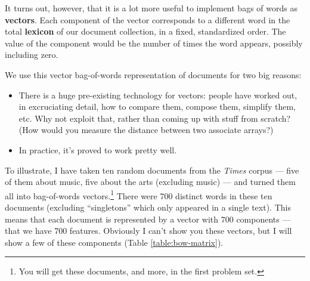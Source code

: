 \documentclass{article}
\begin{document}
It turns out, however, that it is a lot more useful to implement bags of words
as {\bf vectors}.  Each component of the vector corresponds to a different word
in the total {\bf lexicon} of our document collection, in a fixed, standardized
order.  The value of the component would be the number of times the word
appears, possibly including zero.

We use this vector bag-of-words representation of documents for two big
reasons:
\begin{itemize}
\item There is a huge pre-existing technology for vectors: people have worked
  out, in excruciating detail, how to compare them, compose them, simplify
  them, etc.  Why not exploit that, rather than coming up with stuff from
  scratch?  (How would you measure the distance between two associate arrays?)
\item In practice, it's proved to work pretty well.
\end{itemize}




To illustrate, I have taken ten random documents from the {\em Times} corpus
--- five of them about music, five about the arts (excluding music) --- and
turned them all into bag-of-words vectors.\footnote{You will get these
  documents, and more, in the first problem set.}  There were 700 distinct
words in these ten documents (excluding ``singletons'' which only appeared in a
single text).  This means that each document is represented by a vector with
700 components --- that we have 700 features.  Obviously I can't show you these
vectors, but I will show a few of these components (Table
\ref{table:bow-matrix}).
\end{document}
